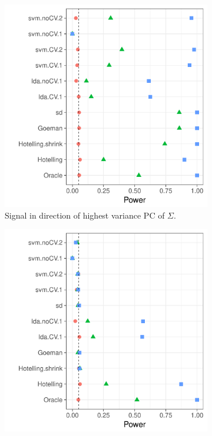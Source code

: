 \documentclass[12pt,a4paper]{article}
\begin{document}
\begin{figure}[h]
	\centering
	\caption{Arbitrary Correlation. 
		$\Sigma=D^{-1} R D^{-1}$ where $D$ is diagonal with $D_{jj}=\sqrt{R_{jj}}$, and $R=A'A$ where $A$ is a Gaussian $p\times p$ random matrix with independent $\mathcal{N}(0,1)$ entries.
	}
	\label{fig:dependence_3}
	\begin{subfigure}[t]{.4\textwidth}
		\centering
		\includegraphics[width=1\linewidth]{"art/file18"}
		\caption{Signal in direction of highest variance PC of $\Sigma$.} 
		\label{fig:dependence_31}
	\end{subfigure}
	\begin{subfigure}[t]{.4\textwidth}
		\centering
		\includegraphics[width=1\linewidth]{"art/file17"}

\end{subfigure}
\end{figure}
\end{document}
